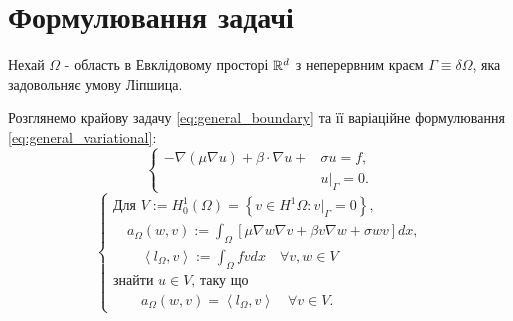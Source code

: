 \clearpage
\section{Формулювання задачі}

Нехай $\Omega$ - область в Евклідовому просторі $\mathbb{R}^d$ з неперервним краєм $\Gamma \equiv \delta \Omega$, яка задовольняє умову Ліпшица.

Розглянемо крайову задачу \eqref{eq:general_boundary} та її варіаційне формулювання \eqref{eq:general_variational}:
%
\begin{equation}\label{eq:general_boundary}
	\begin{cases}
			- \nabla (\mu \nabla u) + \beta \cdot \nabla u + &\sigma u = f,  \\
			&u|_\Gamma = 0.
	\end{cases}
\end{equation}
%
\begin{equation}\label{eq:general_variational}
	\begin{cases}
		\mbox{Для } V := H_0^1 \left( \Omega \right) =
		\left\lbrace
			v \in H^1 \Omega : v|_\Gamma = 0
		\right\rbrace, \\

		\quad a_\Omega(w,v) := \displaystyle\int_\Omega
		\left[
			\mu \nabla w \nabla v +\beta v \nabla w + \sigma wv
		\right] dx, \\

		\qquad \left\langle l_\Omega, v \right\rangle := \displaystyle\int_\Omega fvdx \quad \forall v,w \in V \\

		\mbox{знайти }u \in V \mbox{, таку що} \\

		\qquad a_\Omega(w,v) = \left\langle l_\Omega, v \right\rangle \quad \forall v \in V.

	\end{cases}
\end{equation}

